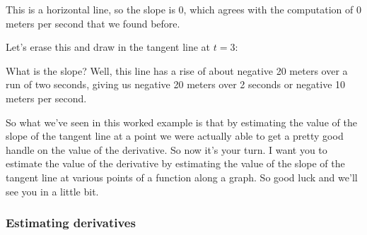 \documentclass[pdftex, brazil, 12pt, twoside]{article}
\begin{document}
This is a horizontal line, so the slope
is 0, which agrees with the computation
of 0 meters per second that we found before.

Let's erase this and draw in the tangent line at $t=3$:

\begin{figure}[H]
  \begin{center}
  \end{center}
\end{figure}

What is the slope?
Well, this line has a rise of about negative 20
meters over a run of two seconds,
giving us negative 20 meters over 2 seconds
or negative 10 meters per second.

So what we've seen in this worked
example is that by estimating the value of the slope
of the tangent line at a point we were actually
able to get a pretty good handle on the value of the derivative.
So now it's your turn.
I want you to estimate the value of the derivative
by estimating the value of the slope of the tangent line
at various points of a function along a graph.
So good luck and we'll see you in a little bit.

\subsubsection{Estimating derivatives}
\label{u1-geometric-estimating-derivatives}
\end{document}
